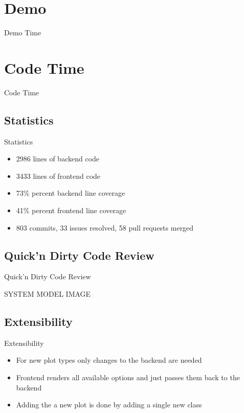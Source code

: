 \documentclass{beamer}
\begin{document}
\section{Demo}
\begin{frame}
  \begin{center}
    \Huge{Demo Time}
  \end{center}
\end{frame}

\section{Code Time}
\begin{frame}
  \begin{center}
    \Huge{Code Time}
  \end{center}
\end{frame}

\subsection{Statistics}
\begin{frame}{Statistics}
  \begin{itemize}
      \item 2986 lines of backend code
      \item 3433 lines of frontend code
      \item 73\% percent backend line coverage
      \item 41\% percent frontend line coverage
      \item 803 commits, 33 issues resolved, 58 pull requests merged
  \end{itemize}
\end{frame}

\subsection{Quick'n Dirty Code Review}
\begin{frame}{Quick'n Dirty Code Review}
  \begin{center}
    \large{SYSTEM MODEL IMAGE}
  \end{center}
\end{frame}

\subsection{Extensibility}
\begin{frame}{Extensibility}
  \begin{itemize}
    \item For new plot types only changes to the backend are needed
    \item Frontend renders all available options and just passes them back to the backend
    \item Adding the a new plot is done by adding a single new class
  \end{itemize}
\end{frame}
\end{document}
